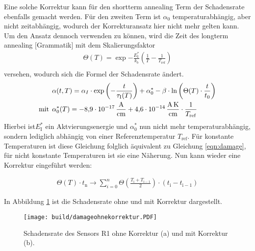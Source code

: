 Eine solche Korrektur kann für den shortterm annealing Term der Schadensrate ebenfalls gemacht werden.
Für den zweiten Term ist $\alpha_{0}$ temperaturabhängig, aber nicht zeitabhängig,
wodurch der Korrekturansatz hier nicht mehr gelten kann. Um den Ansatz dennoch
verwenden zu können, wird die Zeit des longterm annealing [Grammatik] mit dem
Skalierungsfaktor
\begin{align}
  \Theta(T) =  \exp{-\frac{E_{\mathrm{I}}^*}{k_b}\left(\frac{1}{T}-\frac{1}{T_{\mathrm{ref}}}\right)} \\
\end{align}
versehen, wodurch sich die Formel der Schadensrate ändert.
\begin{align}
  &\alpha(t, T) = \alpha_I \cdot \exp{\left(-\frac{t}{\tau_{\mathrm{I}}(T)}\right)} + \alpha_{\mathrm{0}}^{*} -\beta \cdot \ln{\left(\Theta(T) \cdot \frac{t}{t_{\mathrm{0}}}\right)} \\
  \medskip
  \text{mit}\:\: &\alpha^*_{\mathrm{0}}(T) = \SI{-8.9e-17}{\ampere\per\centi\meter} + \SI{4.6e-14}{\ampere\kelvin\per\centi\meter} \cdot \frac{1}{T_{\mathrm{ref}}}
\end{align}
Hierbei ist$E_{\mathrm{I}}^*$ ein Aktvierungsenergie und $\alpha^*_{0}$ nun nicht mehr temperaturabhängig,
sondern lediglich abhängig von einer Referenztemperatur $T_{\mathrm{ref}}$. Für konstante Temperaturen
ist diese Gleichung folglich äquivalent zu Gleichung \ref{eqn:damage}, für nicht
konstante Temperaturen ist sie eine Näherung.
Nun kann wieder eine Korrektur eingeführt werden:

\begin{align}
  \Theta(T) \cdot t_{\mathrm{n}} \rightarrow \sum_{i=0}^n   \Theta \left(\frac{T_{\mathrm{i}} +T_{\mathrm{i-1}}}{2}\right) \cdot  (t_{\mathrm{i}} - t_{\mathrm{i-1}})
\end{align}

In Abbildung \ref{fig:korrektur_damage} ist die Schadensrate ohne und mit Korrektur
dargestellt.

\begin{figure}
    \texttt{[image: build/damageohnekorrektur.PDF]}
\caption{Schadensrate des Sensors R1 ohne Korrektur (a) und mit Korrektur (b).}
\label{fig:korrektur_damage}
\end{figure}


